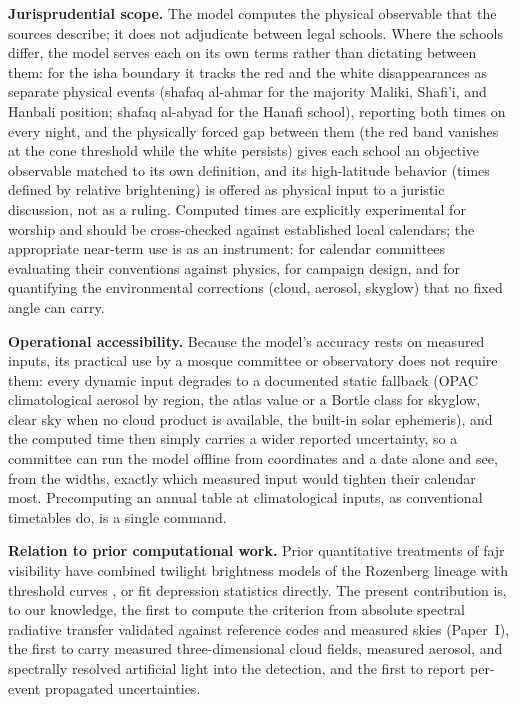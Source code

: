 \documentclass[preprint,12pt]{elsarticle}
\begin{document}
\textbf{Jurisprudential scope.} The model computes the physical
observable that the sources describe; it does not adjudicate between
legal schools. Where the schools differ, the model serves each on its own terms
rather than dictating between them: for the isha boundary it tracks
the red and the white disappearances as separate physical events
(shafaq al-ahmar for the majority Maliki, Shafi'i, and Hanbali
position; shafaq al-abyad for the Hanafi school), reporting both
times on every night, and the physically forced gap between them
(the red band vanishes at the cone threshold while the white persists)
gives each school an objective observable matched to its own
definition, and its high-latitude behavior
(times defined by relative brightening) is offered as physical input to
a juristic discussion, not as a ruling. Computed times are explicitly
experimental for worship and should be cross-checked against established
local calendars; the appropriate near-term use is as an instrument: for
calendar committees evaluating their conventions against physics, for
campaign design, and for quantifying the environmental corrections
(cloud, aerosol, skyglow) that no fixed angle can carry.

\textbf{Operational accessibility.} Because the model's accuracy
rests on measured inputs, its practical use by a mosque committee or
observatory does not require them: every dynamic input degrades to a
documented static fallback (OPAC climatological aerosol by region,
the atlas value or a Bortle class for skyglow, clear sky when no
cloud product is available, the built-in solar ephemeris), and the
computed time then simply carries a wider reported uncertainty, so a
committee can run the model offline from coordinates and a date alone
and see, from the widths, exactly which measured input would tighten
their calendar most. Precomputing an annual table at climatological
inputs, as conventional timetables do, is a single command.

\textbf{Relation to prior computational work.} Prior quantitative
treatments of fajr visibility have combined twilight brightness models
of the Rozenberg lineage with threshold curves \citep{ilyas1984}, or fit
depression statistics directly. The present contribution is, to our
knowledge, the first to compute the criterion from absolute spectral
radiative transfer validated against reference codes and measured skies
(Paper~I), the first to carry measured three-dimensional cloud fields,
measured aerosol, and spectrally resolved artificial light into the
detection, and the first to report per-event propagated uncertainties.
\end{document}
